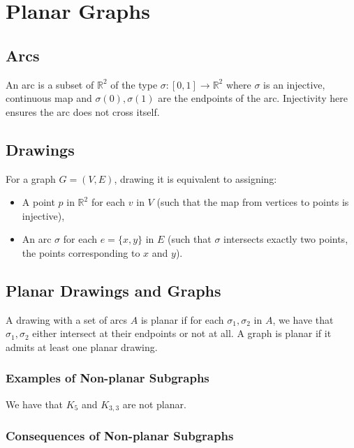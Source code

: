 \section{Planar Graphs}

\subsection{Arcs}

An arc is a subset of $\mathbb{R}^2$ of the type $\sigma : [0, 1] \to \mathbb{R}^2$ 
where $\sigma$ is an injective, continuous map and $\sigma(0), \sigma(1)$
are the endpoints of the arc. Injectivity here ensures the arc does not cross itself.

\subsection{Drawings}

For a graph $G = (V, E)$, drawing it is equivalent to assigning: \begin{itemize}
  \item A point $p$ in $\mathbb{R}^2$ for each $v$ in $V$ (such that the map
  from vertices to points is injective),
  \item An arc $\sigma$ for each $e = \{x, y\}$ in $E$ (such that $\sigma$ intersects
  exactly two points, the points corresponding to $x$ and $y$).
\end{itemize}

\subsection{Planar Drawings and Graphs}

A drawing with a set of arcs $A$ is planar if for each $\sigma_1, \sigma_2$ in $A$, 
we have that $\sigma_1, \sigma_2$ either intersect at their endpoints or not at all.
A graph is planar if it admits at least one planar drawing.

\subsubsection{Examples of Non-planar Subgraphs}

We have that $K_5$ and $K_{3, 3}$ are not planar.

\subsubsection{Consequences of Non-planar Subgraphs}

